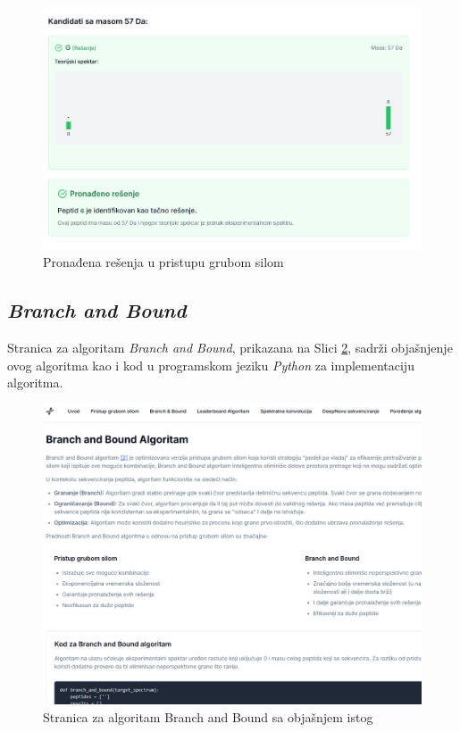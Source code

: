 \documentclass[12pt,oneside]{memoir}
\begin{document}
\begin{figure}[H]
\centering
\includegraphics[width=1\textwidth]{images/brute_force_3.png}
\caption{Pronađena rešenja u pristupu grubom silom}
\label{fig:brute_force_3}
\end{figure}

\subsection{\emph{Branch and Bound}}
Stranica za algoritam \emph{Branch and Bound}, prikazana na Slici \ref{fig:branch_and_bound}, sadrži objašnjenje ovog algoritma kao i kod u programskom jeziku \emph{Python} za implementaciju algoritma.
\begin{figure}[h]
\centering
\includegraphics[width=1\textwidth]{images/branch_and_bound.png}
\caption{Stranica za algoritam Branch and Bound sa objašnjem istog}
\label{fig:branch_and_bound}
\end{figure}
\end{document}

